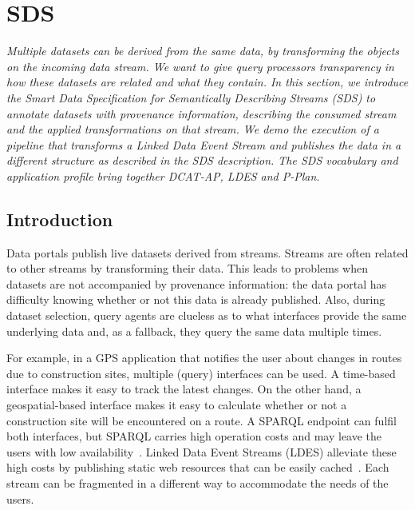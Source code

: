 
\section{SDS}\label{sec:sds}

\noindent\textit{Multiple datasets can be derived from the same data, by
transforming the objects on the incoming data stream. We want to give query
processors transparency in how these datasets are related and what they
contain. In this section, we introduce the Smart Data Specification for
Semantically Describing Streams (SDS) to annotate datasets with provenance
information, describing the consumed stream and the applied transformations
on that stream. We demo the execution of a pipeline that transforms a Linked
Data Event Stream and publishes the data in a different structure as
described in the SDS description. The SDS vocabulary and application profile
bring together DCAT-AP, LDES and P-Plan.}
\vspace{1em}

\subsection{Introduction}

Data portals publish live datasets derived from streams. Streams are often
related to other streams by transforming their data. This leads to problems
when datasets are not accompanied by provenance information: the data portal
has difficulty knowing whether or not this data is already published. Also,
during dataset selection, query agents are clueless as to what interfaces
provide the same underlying data and, as a fallback, they query the same
data multiple times.

For example, in a GPS application that notifies the user about changes in
routes due to construction sites, multiple (query) interfaces can be used. A
time-based interface makes it easy to track the latest changes. On the other
hand, a geospatial-based interface makes it easy to calculate whether or not
a construction site will be encountered on a route. A SPARQL endpoint can
fulfil both interfaces, but SPARQL carries high operation costs and may
leave the users with low availability~\cite{SPARQL}. Linked Data Event
Streams (LDES) alleviate these high costs by publishing static web resources
that can be easily cached~\cite{LDES}. Each stream can be fragmented in a
different way to accommodate the needs of the users.

